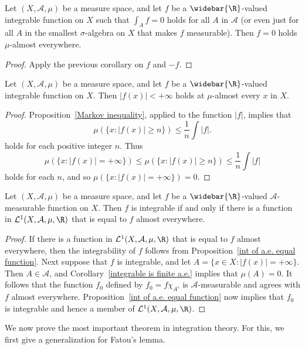 \begin{corollary}\label{int zero on every set iff zero a.e.}
Let $(X,\mathcal{A},\mu)$ be a measure space, and let $f$ be a $\widebar{\R}$-valued integrable function on $X$ such that $\int_Af=0$ holds for all $A$ in $\mathcal{A}$ (or even just for all $A$ in the smallest $\sigma$-algebra on $X$ that makes $f$ measurable). Then $f=0$ holds $\mu$-almost everywhere.
\end{corollary}
\begin{proof}
Apply the previous corollary on $f$ and $-f$.
\end{proof}
\begin{corollary}\label{integrable is finite a.e.}
Let $(X,\mathcal{A},\mu)$ be a measure space, and let $f$ be a $\widebar{\R}$-valued integrable function on $X$. Then $|f(x)|<+\infty$ holds at $\mu$-almost every $x$ in $X$.
\end{corollary}
\begin{proof}
Proposition~\ref{Markov inequality}, applied to the function $|f|$, implies that
\[\mu(\{x:|f(x)|\geq n\})\leq\frac{1}{n}\int|f|.\]
holds for each positive integer $n$. Thus
\[\mu(\{x:|f(x)|=+\infty\})\leq\mu(\{x:|f(x)|\geq n\})\leq\frac{1}{n}\int|f|\]
holds for each $n$, and so $\mu(\{x:|f(x)|=+\infty\})=0$.
\end{proof}
\begin{corollary}\label{integrable iff finite a.e.}
Let $(X,\mathcal{A},\mu)$ be a measure space, and let $f$ be a $\widebar{\R}$-valued $\mathcal{A}$-measurable function on $X$. Then $f$ is integrable if and only if there is a function in $\mathcal{L}^1(X,\mathcal{A},\mu,\R)$ that is equal to $f$ almost everywhere.
\end{corollary}
\begin{proof}
If there is a function in $\mathcal{L}^1(X,\mathcal{A},\mu,\R)$ that is equal to $f$ almost everywhere, then the integrability of $f$ follows from Proposition~\ref{int of a.e. equal function}. Next suppose that $f$ is integrable, and let $A=\{x\in X:|f(x)|=+\infty\}$. Then $A\in\mathcal{A}$, and Corollary~\ref{integrable is finite a.e.} implies that $\mu(A)=0$. It follows that the function $f_0$ defined by $f_0=f\chi_{A^c}$ is $\mathcal{A}$-measurable and agrees with $f$ almost everywhere. Proposition~\ref{int of a.e. equal function} now implies that $f_0$ is integrable and hence a member of $\mathcal{L}^1(X,\mathcal{A},\mu,\R)$.
\end{proof}
We now prove the most important theorem in integration theory. For this, we first give a generalization for Fatou's lemma.
